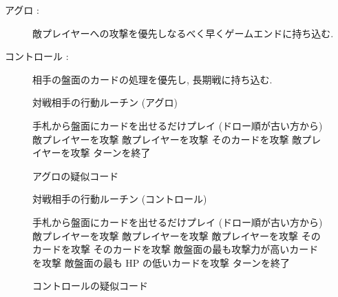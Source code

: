 \documentclass[12pt]{jarticle}
\begin{document}
\begin{description}
  \item[アグロ :]  敵プレイヤーへの攻撃を優先しなるべく早くゲームエンドに持ち込む. 
  \item[コントロール :]  相手の盤面のカードの処理を優先し, 長期戦に持ち込む.
\end{description}

\begin{figure}[t]
  \vspace{-0.3cm}
  \begin{algorithm}[H]
    \small
      \caption{
        対戦相手の行動ルーチン (アグロ)
        }
      \label{alg_aggro}
      \begin{algorithmic}[1] 
      \STATE 手札から盤面にカードを出せるだけプレイ (ドロー順が古い方から)
      \STATE 敵プレイヤーを攻撃
      \ELSE
      \STATE 敵プレイヤーを攻撃
      \ELSE
      \STATE そのカードを攻撃
      \ELSE
      \STATE 敵プレイヤーを攻撃
      \ENDIF
      \ENDIF
      \ENDIF
      \ENDFOR
      \STATE ターンを終了
      \end{algorithmic}
  \end{algorithm}
  \caption{アグロの疑似コード}
  \end{figure}

  \begin{figure}[t]
    \vspace{-0.3cm}
    \begin{algorithm}[H]
      \small
        \caption{
          対戦相手の行動ルーチン (コントロール)
          }
        \label{alg_controll}
        
        \begin{algorithmic}[1] 
        \STATE 手札から盤面にカードを出せるだけプレイ (ドロー順が古い方から)
        \STATE 敵プレイヤーを攻撃
        \ELSE
        \STATE 敵プレイヤーを攻撃
        \ENDIF
        \STATE 敵プレイヤーを攻撃
        \ENDIF
        \STATE そのカードを攻撃
        \ENDIF
        \STATE そのカードを攻撃
        \ELSE
        \STATE 敵盤面の最も攻撃力が高いカードを攻撃
        \ELSE
        \STATE 敵盤面の最も HP の低いカードを攻撃
        \ENDIF
        \ENDIF
        \ENDIF
        \ENDFOR
        \STATE ターンを終了
        \end{algorithmic}
    \end{algorithm}
    \caption{コントロールの疑似コード}
    \end{figure}
\end{document}
